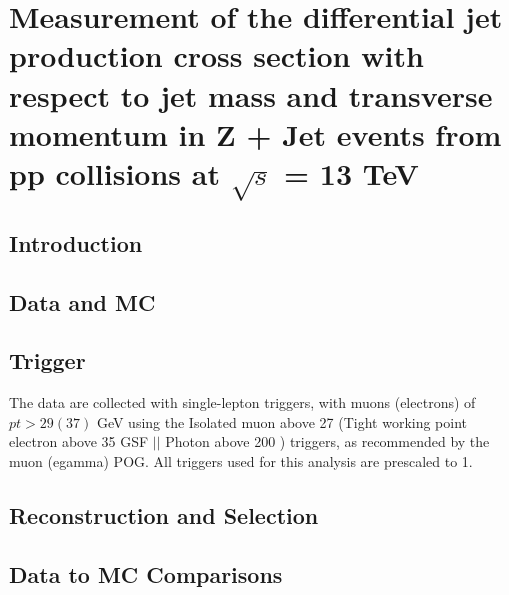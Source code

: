 \chapter{Measurement of the differential jet production cross section with respect to jet mass and transverse momentum in
Z + Jet events from pp collisions at $\sqrt{s}$ = 13 TeV}\label{chap:AN-18-240}


%





\section{Introduction}



\section{Data and MC}





\section{Trigger}

The data are collected with single-lepton triggers, with muons (electrons) of $pt > 29 (37)$ GeV using the Isolated muon above 27 \GeV (Tight working point electron above 35 \GeV GSF $ || $ Photon above 200 \GeV) triggers, as recommended by the muon (egamma) POG. All triggers used for this analysis are prescaled to 1. 





\section{Reconstruction and Selection}




\section{Data to MC Comparisons}



